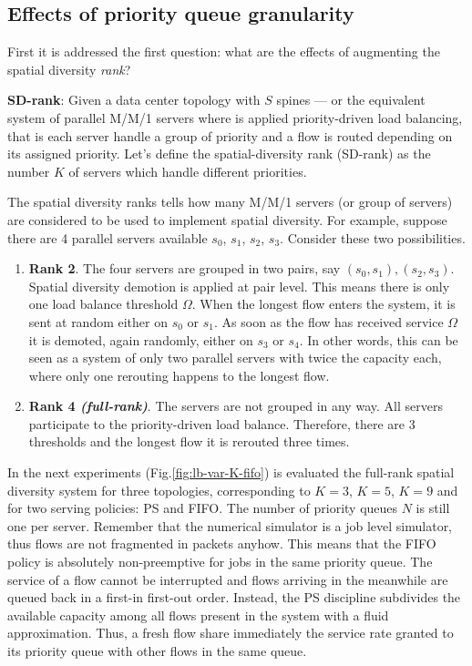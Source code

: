 \subsection{Effects of priority queue granularity}
\label{sec:dimensioning-spatial}
First it is addressed the first question: what are the effects of augmenting the spatial diversity \emph{rank}? 
\begin{tcolorbox}[title=Terminology]
	\textbf{SD-rank}: Given a data center topology with $S$ spines --- or the equivalent system of parallel M/M/1 servers where is applied priority-driven load balancing, that is each server handle a group of priority and a flow is routed depending on its assigned priority. Let's define the spatial-diversity rank (SD-rank) as the number $K$ of servers which handle different priorities. 
\end{tcolorbox}
The spatial diversity ranks tells how many M/M/1 servers (or group of servers) are considered to be used to implement spatial diversity. For example, suppose there are 4 parallel servers available $s_0$, $s_1$, $s_2$, $s_3$. Consider these two possibilities. 
\begin{enumerate}
	\item \textbf{Rank 2}. The four servers are grouped in two pairs, say $(s_0, s_1), (s_2,s_3)$. Spatial diversity demotion is applied at pair level. This means there is only one load balance threshold $\Omega$. When the longest flow enters the system, it is sent at random either on $s_0$ or $s_1$. As soon as the flow has received service $\Omega$ it is demoted, again randomly, either on $s_3$ or $s_4$. In other words, this can be seen as a system of only two parallel servers with twice the capacity each, where only one rerouting happens to the longest flow. 
	\item \textbf{Rank 4 \textit{(full-rank)}}. The servers are not grouped in any way. All servers participate to the priority-driven load balance. Therefore, there are 3 thresholds and the longest flow it is rerouted three times.
\end{enumerate}
In the next experiments (Fig.\ref{fig:lb-var-K-fifo}) is evaluated the full-rank spatial diversity system for three topologies, corresponding to $K=3$, $K=5$, $K=9$ and for two serving policies: PS and FIFO. The number of priority queues $N$ is still one per server. Remember that the numerical simulator is a job level simulator, thus flows are not fragmented in packets anyhow. This means that the FIFO policy is absolutely non-preemptive for jobs in the same priority queue. The service of a flow cannot be interrupted and flows arriving in the meanwhile are queued back in a first-in first-out order. Instead, the PS discipline subdivides the available capacity among all flows present in the system with a fluid approximation. Thus, a fresh flow share immediately the service rate granted to its priority queue with other flows in the same queue. 
